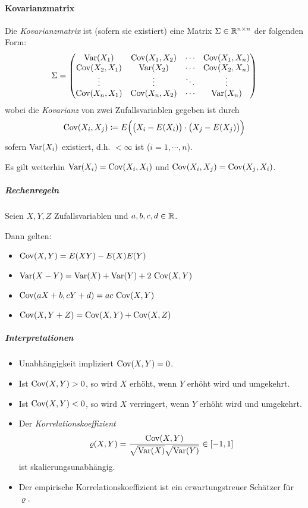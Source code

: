 		\paragraph{Kovarianzmatrix}
			Die \textit{Kovarianzmatrix} ist (sofern sie existiert) eine Matrix \( \Sigma \in \mathbb{R}^{n \times n} \) der folgenden Form:
			\begin{equation*}
				\Sigma =
				\begin{pmatrix}
					\operatorname{Var}(X_1)      & \operatorname{Cov}(X_1, X_2) & \cdots & \operatorname{Cov}(X_1, X_n) \\
					\operatorname{Cov}(X_2, X_1) & \operatorname{Var}(X_2)      & \cdots & \operatorname{Cov}(X_2, X_n) \\
					\vdots         & \vdots         & \ddots & \vdots         \\
					\operatorname{Cov}(X_n, X_1) & \operatorname{Cov}(X_n, X_2) & \cdots & \operatorname{Var}(X_n)
				\end{pmatrix}
			\end{equation*}
			wobei die \textit{Kovarianz} von zwei Zufallsvariablen gegeben ist durch \[ \operatorname{Cov}(X_i, X_j) \coloneqq E\Big( \big(X_i - E(X_i)\big) \cdot \big(X_j - E(X_j)\big) \Big) \] sofern \( \operatorname{Var}(X_i) \) existiert, d.h. \( < \infty \) ist (\( i = 1, \cdots, n \)).

			Es gilt weiterhin \( \operatorname{Var}(X_i) = \operatorname{Cov}(X_i, X_i) \) und \( \operatorname{Cov}(X_i, X_j) = \operatorname{Cov}(X_j, X_i) \).

			\subparagraph{Rechenregeln}
				Seien \(X, Y, Z\) Zufallsvariablen und \( a, b, c, d \in \mathbb{R} \).

				Dann gelten:
				\begin{itemize}
					\item \( \operatorname{Cov}(X, Y) = E(XY) - E(X) E(Y) \)
					\item \( \operatorname{Var}(X - Y) = \operatorname{Var}(X) + \operatorname{Var}(Y) + 2 \, \operatorname{Cov}(X, Y) \)
					\item \( \operatorname{Cov}(aX + b, cY + d) = ac \, \operatorname{Cov}(X, Y) \)
					\item \( \operatorname{Cov}(X, Y + Z) = \operatorname{Cov}(X, Y) + \operatorname{Cov}(X, Z) \)
				\end{itemize}

			\subparagraph{Interpretationen}
				\begin{itemize}
					\item Unabhängigkeit impliziert \( \operatorname{Cov}(X, Y) = 0 \).
					\item Ist \( \operatorname{Cov}(X, Y) > 0 \), so wird \(X\) erhöht, wenn \(Y\) erhöht wird und umgekehrt.
					\item Ist \( \operatorname{Cov}(X, Y) < 0 \), so wird \(X\) verringert, wenn \(Y\) erhöht wird und umgekehrt.
					\item Der \textit{Korrelationskoeffizient}
						\begin{equation*}
							\varrho(X, Y) = \frac{\operatorname{Cov}(X, Y)}{\sqrt{\operatorname{Var}(X)} \sqrt{\operatorname{Var}(Y)}} \in [-1, 1]
						\end{equation*}
						ist skalierungsunabhängig.
					\item Der empirische Korrelationskoeffizient ist ein erwartungstreuer Schätzer für \( \varrho \).
				\end{itemize}


